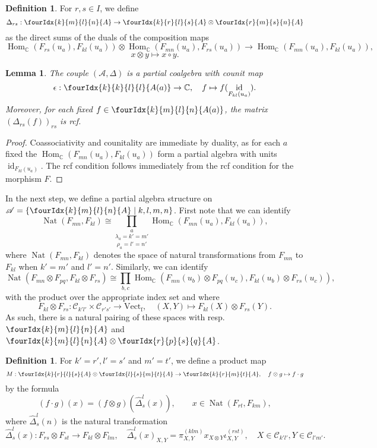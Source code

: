\documentclass[10pt]{article}
\DeclareMathOperator{\fin}{\mathrm{f}}
\DeclareMathOperator{\id}{id}
\DeclareMathOperator{\Hom}{Hom}
\DeclareMathOperator{\Nat}{\mathrm{Nat}}
\newcommand{\C}{\mathbb{C}}
\newcommand{\CatC}{\mathcal{C}}
\newcommand{\Vect}{\mathrm{Vect}}
\newcommand{\Gr}[5]{\fourIdx{#2}{#4}{#3}{#5}{#1}}%
\newtheorem{Lem}[Theorem]{Lemma}
\theoremstyle{definition}
\newtheorem{Def}[Theorem]{Definition}
\numberwithin{equation}{section}
\begin{document}
\begin{Def} For $r,s\in I$, we define \[\Delta_{rs}: \Gr{A}{k}{l}{m}{n}\rightarrow \Gr{A}{k}{l}{r}{s}\otimes \Gr{A}{r}{s}{m}{n}\] as the direct sums of the duals of the composition maps \[\Hom_{\C}(F_{rs}(u_a),F_{kl}(u_a)) \otimes \Hom_{\C}(F_{mn}(u_a),F_{rs}(u_a))\rightarrow \Hom_{\C}(F_{mn}(u_a),F_{kl}(u_a)),\]\[x\otimes y \mapsto x\circ y.\]
\end{Def} 

\begin{Lem} The couple $(\mathscr{A},\Delta)$ is a partial coalgebra with counit map \[\epsilon:\Gr{A(a)}{k}{l}{k}{l}\rightarrow \C,\quad f\mapsto f(\id_{F_{kl}(u_a)}).\] Moreover, for each fixed $f\in \Gr{A(a)}{k}{l}{m}{n}$, the matrix $\left(\Delta_{rs}(f)\right)_{rs}$ is rcf.
\end{Lem} 
\begin{proof} Coassociativity and counitality are immediate by duality, as for each $a$ fixed the $\Hom_{\C}(F_{mn}(u_a),F_{kl}(u_a))$ form a partial algebra with units $\id_{F_{kl}(u_a)}$. The rcf condition follows immediately from the rcf condition for the morphism $F$.
\end{proof}

In the next step, we define a partial algebra structure on $\mathscr{A} = \{\Gr{A}{k}{l}{m}{n}\mid k,l,m,n\}$. First note that we can identify \[\Nat(F_{mn},F_{kl}) \cong \underset{\rho_a=l'=n'}{\underset{\lambda_a=k'=m'}{\prod_a}} \Hom_{\C}(F_{mn}(u_a),F_{kl}(u_a)),\] where $\Nat(F_{mn},F_{kl})$ denotes the space of natural transformations from $F_{mn}$ to $F_{kl}$ when $k'=m'$ and $l'=n'$. Similarly, we can identify \[\Nat(F_{mn}\otimes F_{pq},F_{kl}\otimes F_{rs}) \cong  \prod_{b,c} \Hom_{\C}(F_{mn}(u_b)\otimes F_{pq}(u_c) ,F_{kl}(u_b)\otimes F_{rs}(u_c)),\] with the product over the appropriate index set and where \[F_{kl}\otimes F_{rs}:\CatC_{k'l'}\times \CatC_{r's'}\rightarrow \Vect_{\fin},\quad (X,Y) \mapsto F_{kl}(X)\otimes F_{rs}(Y).\] As such, there is a natural pairing of these spaces with resp.~ $\Gr{A}{k}{l}{m}{n}$ and $\Gr{A}{k}{l}{m}{n}\otimes \Gr{A}{r}{s}{p}{q}$. 

\begin{Def} For $k'=r', l'=s'$ and $m'=t'$, we define a product map \[M:\Gr{A}{k}{l}{r}{s} \otimes \Gr{A}{l}{m}{s}{t}\rightarrow  \Gr{A}{k}{m}{r}{t},\quad f\otimes g \mapsto f\cdot g\] by the formula \[(f\cdot g)(x) = (f\otimes g)( \hat{\Delta}^{l}_{s}(x)), \qquad  x \in \Nat(F_{rt},F_{km}),\] where $\hat{\Delta}^l_s(n)$ is the natural transformation\[\hat{\Delta}^l_s(x):  F_{rs}\otimes F_{st}\rightarrow F_{kl}\otimes F_{lm},\quad \hat{\Delta}^l_s(x)_{X,Y} = \pi^{(klm)}_{X,Y}x_{X\otimes Y} \iota^{(rst)}_{X,Y},\quad X\in \CatC_{k'l'},Y\in \CatC_{l'm'}.\]
\end{Def}
\end{document}
